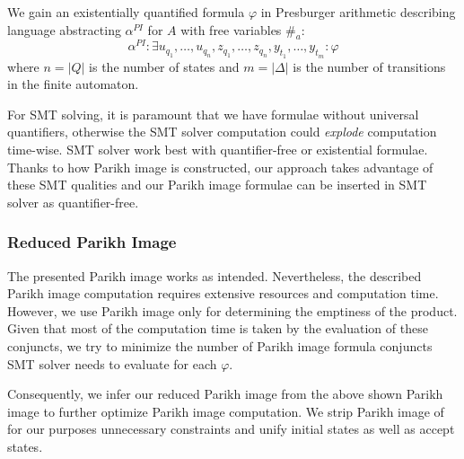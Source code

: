 We gain an existentially quantified formula $\varphi$ in Presburger arithmetic describing language abstracting $\alpha^{PI}$ for $A$ with free variables $\#_a$:
$$ \alpha^{PI} : \exists u_{q_1},\ldots,u_{q_n},z_{q_1},\ldots,z_{q_n},y_{t_1},\ldots,y_{t_m} : \varphi $$
where $n = \lvert Q \rvert$ is the number of states and $m = \lvert \Delta \rvert$ is the number of transitions in the finite automaton.

For SMT solving, it is paramount that we have formulae without universal quantifiers, otherwise the SMT solver computation could \emph{explode} computation time-wise. SMT solver work best with quantifier-free or existential formulae. Thanks to how Parikh image is constructed, our approach takes advantage of these SMT qualities and our Parikh image formulae can be inserted in SMT solver as quantifier-free.

\subsubsection{Reduced Parikh Image}\label{sec:reducedParikhImage}

The presented Parikh image works as intended. Nevertheless, the described Parikh image computation requires extensive resources and computation time. However, we use Parikh image only for determining the emptiness of the product. Given that most of the computation time is taken by the evaluation of these conjuncts, we try to minimize the number of Parikh image formula conjuncts SMT solver needs to evaluate for each $\varphi$.

Consequently, we infer our reduced Parikh image from the above shown Parikh image to further optimize Parikh image computation. We strip Parikh image of for our purposes unnecessary constraints and unify initial states as well as accept states.


